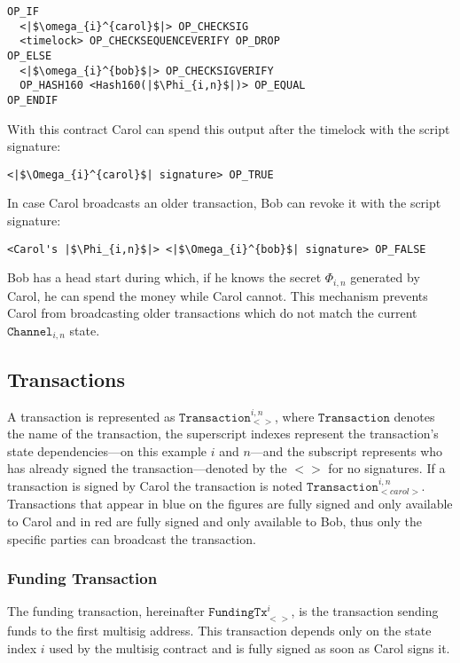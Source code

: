 \documentclass{llncs}
\begin{document}

\begin{verbatim}
OP_IF
  <|$\omega_{i}^{carol}$|> OP_CHECKSIG
  <timelock> OP_CHECKSEQUENCEVERIFY OP_DROP
OP_ELSE
  <|$\omega_{i}^{bob}$|> OP_CHECKSIGVERIFY
  OP_HASH160 <Hash160(|$\Phi_{i,n}$|)> OP_EQUAL
OP_ENDIF
\end{verbatim}

With this contract Carol can spend this output after the timelock with the
script signature:

\begin{verbatim}
<|$\Omega_{i}^{carol}$| signature> OP_TRUE
\end{verbatim}

In case Carol broadcasts an older transaction, Bob can revoke it with the script
signature:

\begin{verbatim}
<Carol's |$\Phi_{i,n}$|> <|$\Omega_{i}^{bob}$| signature> OP_FALSE
\end{verbatim}

Bob has a head start during which, if he knows the secret $\Phi_{i,n}$ generated
by Carol, he can spend the money while Carol cannot. This mechanism prevents
Carol from broadcasting older transactions which do not match the current
$\texttt{Channel}_{i,n}$ state.

\subsection{Transactions} A transaction is represented as
$\texttt{Transaction}_{<>}^{i,n}$, where $\texttt{Transaction}$ denotes the name
of the transaction, the superscript indexes represent the transaction's state
dependencies---on this example $i$ and $n$---and the subscript represents who
has already signed the transaction---denoted by the $<>$ for no signatures. If a
transaction is signed by Carol the transaction is noted
$\texttt{Transaction}_{<carol>}^{i,n}$. Transactions that appear in blue on the
figures are fully signed and only available to Carol and in red are fully signed
and only available to Bob, thus only the specific parties can broadcast the
transaction.

\subsubsection{Funding Transaction} The funding transaction, hereinafter
$\texttt{FundingTx}_{<>}^{i}$, is the transaction sending funds to the first
multisig address. This transaction depends only on the state index $i$ used by
the multisig contract and is fully signed as soon as Carol signs it.
\end{document}
